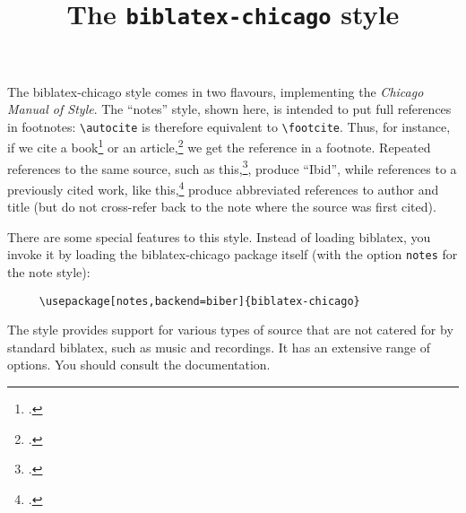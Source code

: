 \documentclass[varwidth=\textwidth,class=article,border=5pt]{standalone}
\begin{document}
\title{The \texttt{biblatex-chicago} style}
\author{}\date{}
\maketitle

The \textsf{biblatex-chicago} style comes in two flavours, implementing the \emph{Chicago Manual of Style}. The \enquote{notes} style, shown here, is intended to put full references in footnotes: \verb|\autocite| is therefore equivalent to \verb|\footcite|. Thus, for instance, if we cite a book\footcite{worman} or an article,\footcite{reese} we get the reference in a footnote. Repeated references to the same source, such as this,\footcite{reese}, produce \enquote{Ibid}, while references to a previously cited work, like this,\footcite{worman} produce abbreviated references to author and title (but do not cross-refer back to the note where the source was first cited).

\quad There are some special features to this style. Instead of loading \textsf{biblatex}, you invoke it by loading the \textsf{biblatex-chicago} package itself (with the option \verb|notes| for the note style):
\begin{verbatim}
     \usepackage[notes,backend=biber]{biblatex-chicago}
\end{verbatim}
The style provides support for various types of source that are not catered for by standard \textsf{biblatex}, such as music and recordings. It has an extensive range of options. You should consult the documentation.

\printbibliography
\end{document}

